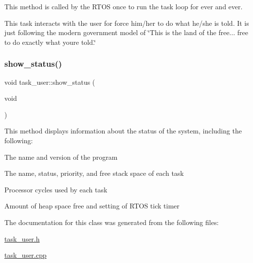 This method is called by the R\+T\+OS once to run the task loop for ever and ever.

This task interacts with the user for force him/her to do what he/she is told. It is just following the modern government model of \char`\"{}\+This is the land of the free...
free to do exactly what you\textquotesingle{}re told.\char`\"{} \mbox{\label{classtask__user_a105bebbd9cb1031154c3dfc3662db4a0}} 
\subsubsection{\texorpdfstring{show\_status()}{show\_status()}}
{\footnotesize\ttfamily void task\+\_\+user\+::show\+\_\+status (\begin{DoxyParamCaption}\item[{void}]{ }\end{DoxyParamCaption})\hspace{0.3cm}{\ttfamily [protected]}}

This method displays information about the status of the system, including the following\+: \begin{DoxyItemize}
\item The name and version of the program \item The name, status, priority, and free stack space of each task \item Processor cycles used by each task \item Amount of heap space free and setting of R\+T\+OS tick timer \end{DoxyItemize}


The documentation for this class was generated from the following files\+:\begin{DoxyCompactItemize}
\item 
\mbox{\hyperlink{task__user_8h}{task\+\_\+user.\+h}}\item 
\mbox{\hyperlink{task__user_8cpp}{task\+\_\+user.\+cpp}}\end{DoxyCompactItemize}
